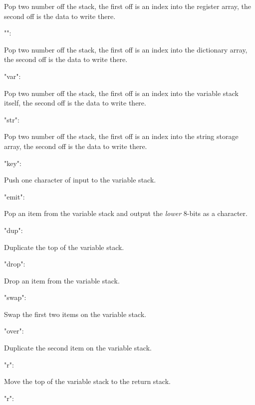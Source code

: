 Pop two number off the stack, the first off is an index into the register array, the second off is the data to write there. \begin{DoxyVerb}   "\!":
\end{DoxyVerb}


Pop two number off the stack, the first off is an index into the dictionary array, the second off is the data to write there. \begin{DoxyVerb}   "\!var":
\end{DoxyVerb}


Pop two number off the stack, the first off is an index into the variable stack itself, the second off is the data to write there. \begin{DoxyVerb}   "\!str":
\end{DoxyVerb}


Pop two number off the stack, the first off is an index into the string storage array, the second off is the data to write there. \begin{DoxyVerb}   "key":
\end{DoxyVerb}


Push one character of input to the variable stack. \begin{DoxyVerb}   "emit":
\end{DoxyVerb}


Pop an item from the variable stack and output the {\itshape lower} 8-\/bits as a character. \begin{DoxyVerb}   "dup":
\end{DoxyVerb}


Duplicate the top of the variable stack. \begin{DoxyVerb}   "drop":
\end{DoxyVerb}


Drop an item from the variable stack. \begin{DoxyVerb}   "swap":
\end{DoxyVerb}


Swap the first two items on the variable stack. \begin{DoxyVerb}   "over":
\end{DoxyVerb}


Duplicate the second item on the variable stack. \begin{DoxyVerb}   "\>r":
\end{DoxyVerb}


Move the top of the variable stack to the return stack. \begin{DoxyVerb}   "r\>":
\end{DoxyVerb}


